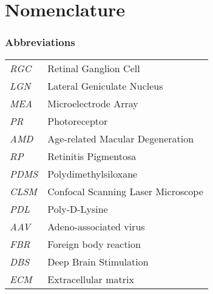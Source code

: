 \chapter*{\LARGE Nomenclature}

\renewcommand{\arraystretch}{1.2} %


\subsection*{Abbreviations}
\vspace{0.5cm}
\begin{tabular}{p{3cm} l}
\textit{RGC}  & Retinal Ganglion Cell  \\
\textit{LGN}  & Lateral Geniculate Nucleus  \\
\textit{MEA}  & Microelectrode Array  \\
\textit{PR}  & Photoreceptor \\
\textit{AMD} & Age-related Macular Degeneration \\
\textit{RP} & Retinitis Pigmentosa \\
\textit{PDMS} & Polydimethylsiloxane \\
\textit{CLSM} & Confocal Scanning Laser Microscope \\
\textit{PDL}  & Poly-D-Lysine  \\ 
\textit{AAV}  & Adeno-associated virus  \\ 
\textit{FBR} & Foreign body reaction \\
\textit{DBS} & Deep Brain Stimulation \\
\textit{ECM} & Extracellular matrix \\

\end{tabular}
